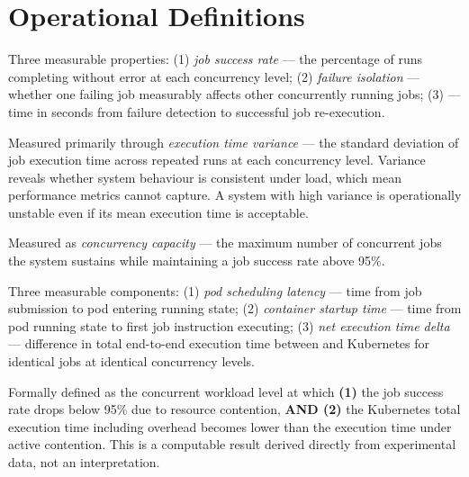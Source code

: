 \section{Operational Definitions}

\begin{description}[leftmargin=3cm, style=nextline]

\item[Reliability]
Three measurable properties: (1) \textit{job success rate} --- the percentage of
\dagster{} runs completing without error at each concurrency level; (2) \textit{failure
isolation} --- whether one failing job measurably affects other concurrently running jobs;
(3) \textit{\mttr{}} --- time in seconds from failure detection to successful job
re-execution.

\item[System Stability]
Measured primarily through \textit{execution time variance} --- the standard deviation of
job execution time across repeated runs at each concurrency level. Variance reveals whether
system behaviour is consistent under load, which mean performance metrics cannot capture.
A system with high variance is operationally unstable even if its mean execution time is
acceptable.

\item[Scalability]
Measured as \textit{concurrency capacity} --- the maximum number of concurrent jobs the
system sustains while maintaining a job success rate above 95\%.

\item[Operational Overhead]
Three measurable components: (1) \textit{pod scheduling latency} --- time from \dagster{}
job submission to pod entering running state; (2) \textit{container startup time} --- time
from pod running state to first job instruction executing; (3) \textit{net execution time
delta} --- difference in total end-to-end execution time between \vm{} and Kubernetes for
identical jobs at identical concurrency levels.

\item[Crossover Point]
Formally defined as the concurrent workload level at which \textbf{(1)} the \vm{} job
success rate drops below 95\% due to resource contention, \textbf{AND (2)} the Kubernetes
total execution time including overhead becomes lower than the \vm{} execution time under
active contention. This is a computable result derived directly from experimental data, not
an interpretation.

\end{description}
